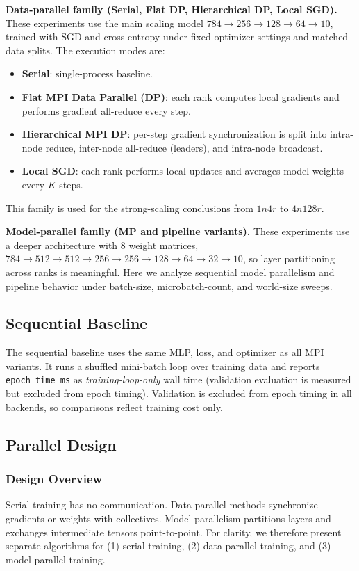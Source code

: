 \documentclass[11pt]{article}
\begin{document}
\noindent\textbf{Data-parallel family (Serial, Flat DP, Hierarchical DP, Local SGD).}
These experiments use the main scaling model
\(784 \rightarrow 256 \rightarrow 128 \rightarrow 64 \rightarrow 10\), trained
with SGD and cross-entropy under fixed optimizer settings and matched data
splits. The execution modes are:
\begin{itemize}[nosep]
  \item \textbf{Serial}: single-process baseline.
  \item \textbf{Flat MPI Data Parallel (DP)}: each rank computes local gradients
        and performs gradient all-reduce every step.
  \item \textbf{Hierarchical MPI DP}: per-step gradient synchronization is split
        into intra-node reduce, inter-node all-reduce (leaders), and intra-node
        broadcast.
  \item \textbf{Local SGD}: each rank performs local updates and averages model
        weights every \(K\) steps.
\end{itemize}
This family is used for the strong-scaling conclusions from \(1n4r\) to
\(4n128r\).

\noindent\textbf{Model-parallel family (MP and pipeline variants).}
These experiments use a deeper architecture with 8 weight matrices,
\(784\!\rightarrow\!512\!\rightarrow\!512\!\rightarrow\!256\!\rightarrow\!256\!\rightarrow\!128\!\rightarrow\!64\!\rightarrow\!32\!\rightarrow\!10\),
so layer partitioning across ranks is meaningful. Here we analyze sequential
model parallelism and pipeline behavior under batch-size, microbatch-count, and
world-size sweeps.

\subsection{Sequential Baseline}
\label{sec:baseline}
The sequential baseline uses the same MLP, loss, and optimizer as all MPI
variants. It runs a shuffled mini-batch loop over training data and reports
\texttt{epoch\_time\_ms} as \emph{training-loop-only} wall time (validation
evaluation is measured but excluded from epoch timing). Validation is excluded from epoch timing in all backends, so comparisons
reflect training cost only.

\subsection{Parallel Design}
\label{sec:parallel-design}
\subsubsection{Design Overview}
Serial training has no communication. Data-parallel methods synchronize gradients or weights with collectives. Model parallelism partitions layers and exchanges intermediate tensors point-to-point. For clarity, we therefore present separate algorithms for (1) serial training, (2) data-parallel training, and (3) model-parallel training.
\end{document}
